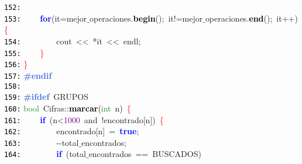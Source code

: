 \documentclass[a4paper,10pt]{scrartcl}
\begin{document}
{   \mbox{}\texttt{\textcolor{Black}{152:}} \ \  \\
   \mbox{}\texttt{\textcolor{Black}{153:}} \ \ \ \ \textbf{\textcolor{Blue}{for}}\textcolor{BrickRed}{(}it\textcolor{BrickRed}{=}mejor$\_$operaciones\textcolor{BrickRed}{.}\textbf{\textcolor{Black}{begin}}\textcolor{BrickRed}{();}\ it\textcolor{BrickRed}{!=}mejor$\_$operaciones\textcolor{BrickRed}{.}\textbf{\textcolor{Black}{end}}\textcolor{BrickRed}{();}\ it\textcolor{BrickRed}{++)}\textcolor{Red}{\{} \\
   \mbox{}\texttt{\textcolor{Black}{154:}} \ \ \ \ \ \ \ \ cout\ \textcolor{BrickRed}{\textless{}\textless{}}\ \textcolor{BrickRed}{*}it\ \textcolor{BrickRed}{\textless{}\textless{}}\ endl\textcolor{BrickRed}{;} \\
   \mbox{}\texttt{\textcolor{Black}{155:}} \ \ \ \ \textcolor{Red}{\}} \\
   \mbox{}\texttt{\textcolor{Black}{156:}} \textcolor{Red}{\}} \\
   \mbox{}\texttt{\textcolor{Black}{157:}} \textbf{\textcolor{RoyalBlue}{\#endif}} \\
   \mbox{}\texttt{\textcolor{Black}{158:}}  \\
   \mbox{}\texttt{\textcolor{Black}{159:}} \textbf{\textcolor{RoyalBlue}{\#ifdef}}\ GRUPOS \\
   \mbox{}\texttt{\textcolor{Black}{160:}} \textcolor{ForestGreen}{bool}\ Cifras\textcolor{BrickRed}{::}\textbf{\textcolor{Black}{marcar}}\textcolor{BrickRed}{(}\textcolor{ForestGreen}{int}\ n\textcolor{BrickRed}{)}\ \textcolor{Red}{\{} \\
   \mbox{}\texttt{\textcolor{Black}{161:}} \ \ \ \ \textbf{\textcolor{Blue}{if}}\ \textcolor{BrickRed}{(}n\textcolor{BrickRed}{\textless{}}\textcolor{Purple}{1000}\ and\ \textcolor{BrickRed}{!}encontrado\textcolor{BrickRed}{[}n\textcolor{BrickRed}{])}\ \textcolor{Red}{\{} \\
   \mbox{}\texttt{\textcolor{Black}{162:}} \ \ \ \ \ \ \ \ encontrado\textcolor{BrickRed}{[}n\textcolor{BrickRed}{]}\ \textcolor{BrickRed}{=}\ \textbf{\textcolor{Blue}{true}}\textcolor{BrickRed}{;} \\
   \mbox{}\texttt{\textcolor{Black}{163:}} \ \ \ \ \ \ \ \ \textcolor{BrickRed}{-\/-}total$\_$encontrados\textcolor{BrickRed}{;} \\
   \mbox{}\texttt{\textcolor{Black}{164:}} \ \ \ \ \ \ \ \ \textbf{\textcolor{Blue}{if}}\ \textcolor{BrickRed}{(}total$\_$encontrados\ \textcolor{BrickRed}{==}\ BUSCADOS\textcolor{BrickRed}{)} \\
}
\end{document}

